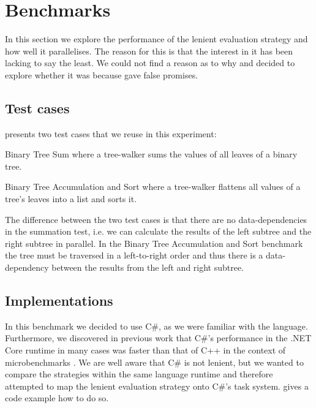 \section{Benchmarks}
In this section we explore the performance of the lenient evaluation strategy and how well it parallelises. The reason for this is that the interest in it has been lacking to say the least. We could not find a reason as to why and decided to explore whether it was because \cite{DBLP:journals/cl/Tremblay-parallel} gave false promises.

\subsection{Test cases}
\cite{DBLP:journals/cl/Tremblay-parallel} presents two test cases that we reuse in this experiment:

\begin{labeling}{\quad\quad}
    \item[Binary Tree Sum] where a tree-walker sums the values of all leaves of a binary tree.
    \item[Binary Tree Accumulation and Sort] where a tree-walker flattens all values of a tree's leaves into a list and sorts it.
\end{labeling}

The difference between the two test cases is that there are no data-dependencies in the summation test, i.e. we can calculate the results of the left subtree and the right subtree in parallel. In the Binary Tree Accumulation and Sort benchmark the tree must be traversed in a left-to-right order and thus there is a data-dependency between the results from the left and right subtree.

\subsection{Implementations}
In this benchmark we decided to use C\#, as we were familiar with the language. Furthermore, we discovered in previous work that C\#'s performance in the .NET Core runtime in many cases was faster than that of C++ in the context of microbenchmarks \cite{p92018gameplay}. We are well aware that C\# is not lenient, but we wanted to compare the strategies within the same language runtime and therefore attempted to map the lenient evaluation strategy onto C\#'s task system.  gives a code example how to do so.

